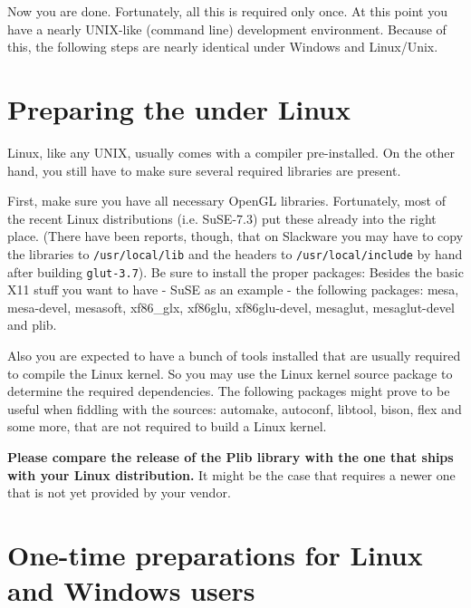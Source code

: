 Now you are done. Fortunately, all this is required only once. At this point you have
a nearly UNIX-like (command line) development environment. Because of this, the following
steps are nearly identical under Windows and Linux/Unix.

\section{Preparing the  under Linux\label{preparelin}}
Linux, like any UNIX, usually comes with a compiler pre-installed. On the other hand, you still have to make sure several required libraries are present.

First, make sure you have all necessary OpenGL libraries. Fortunately, most of the recent Linux distributions (i.e. SuSE-7.3) put these already into the right place. (There have been reports, though, that on  Slackware you may have to copy the libraries to \texttt{/usr/local/lib} and the headers to \texttt{/usr/local/include} by hand after building \texttt{glut-3.7}). Be sure to install the proper packages: Besides the basic X11 stuff you want to have - SuSE as an
example - the following packages: mesa, mesa-devel, mesasoft, xf86\_glx,
xf86glu, xf86glu-devel, mesaglut, mesaglut-devel and plib. 

Also you are expected to have a bunch of tools installed that are usually
required to compile the Linux kernel. So you may use the Linux kernel source
package to determine the required dependencies. The following packages
might prove to be useful when fiddling with the \FlightGear{} sources:
automake, autoconf, libtool, bison, flex and some more, that are not
required to build a Linux kernel.

{\bfseries Please compare the release of the Plib library with the one that ships with
your Linux distribution.} It might be the case that \FlightGear{} requires a
newer one that is not yet provided by your vendor.

\section{One-time preparations for Linux and Windows users\label{preparelinwin}}

